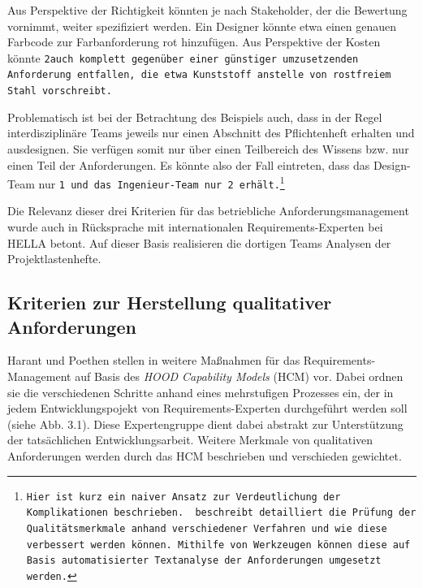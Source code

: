 \documentclass[12pt]{report}
\begin{document}
Aus Perspektive der Richtigkeit könnten je nach Stakeholder, der die Bewertung vornimmt, weiter spezifiziert werden. Ein Designer könnte etwa einen genauen Farbcode zur Farbanforderung \glqq rot\grqq{} hinzufügen. Aus Perspektive der Kosten könnte \tt 2\rm auch komplett gegenüber einer günstiger umzusetzenden Anforderung entfallen, die etwa \glqq Kunststoff\grqq{} anstelle von \glqq rostfreiem Stahl\grqq{} vorschreibt.

Problematisch ist bei der Betrachtung des Beispiels auch, dass in der Regel interdisziplinäre Teams jeweils nur einen Abschnitt des Pflichtenheft erhalten und ausdesignen. Sie verfügen somit nur über einen Teilbereich des Wissens bzw. nur einen Teil der Anforderungen. Es könnte also der Fall eintreten, dass das Design-Team nur \tt 1 \rm und das Ingenieur-Team nur \tt 2 \rm erhält.\footnote{Hier ist kurz ein naiver Ansatz zur Verdeutlichung der Komplikationen beschrieben. \cite{zg02} beschreibt detailliert die Prüfung der Qualitätsmerkmale anhand verschiedener Verfahren und wie diese verbessert werden können. Mithilfe von Werkzeugen können diese auf Basis automatisierter Textanalyse der Anforderungen umgesetzt werden.}

Die Relevanz dieser drei Kriterien für das betriebliche Anforderungsmanagement wurde auch in Rücksprache mit internationalen Requirements-Experten bei HELLA betont. Auf dieser Basis realisieren die dortigen Teams Analysen der Projektlastenhefte. 

\subsection{Kriterien zur Herstellung qualitativer Anforderungen}
Harant und Poethen stellen in \cite{hp12} weitere Maßnahmen für das Requirements-Management auf Basis des \textit{HOOD Capability Models} (HCM) vor. Dabei ordnen sie die verschiedenen Schritte anhand eines mehrstufigen Prozesses ein, der in jedem Entwicklungspojekt von Requirements-Experten durchgeführt werden soll (siehe Abb. 3.1). Diese Expertengruppe dient dabei abstrakt zur Unterstützung der tatsächlichen Entwicklungsarbeit. Weitere Merkmale von qualitativen Anforderungen werden durch das HCM beschrieben und verschieden gewichtet. 
\end{document}
